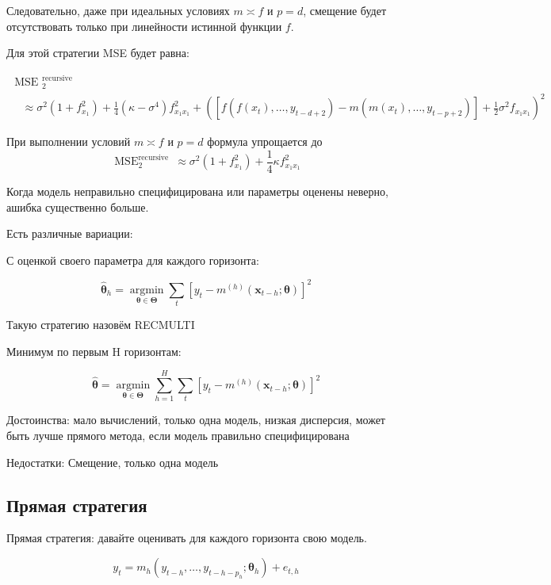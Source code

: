 \documentclass[a4paper,12pt]{article}
\begin{document}
 Следовательно, даже при идеальных условиях  $ m \asymp f $ и $ p = d $, смещение будет отсутствовать только при линейности истинной функции $ f $. 
 
 Для этой стратегии MSE будет равна:
 
\[
\begin{array}{l}{\text { MSE }_{2}^{\text {recursive }}} \\ {\quad \approx \sigma^{2}\left(1+f_{x_{1}}^{2}\right)+\frac{1}{4}\left(\kappa-\sigma^{4}\right) f_{x_{1} x_{1}}^{2}+\left(\left[f\left(f\left(x_{t}\right), \ldots, y_{t-d+2}\right)-m\left(m\left(x_{t}\right), \ldots, y_{t-p+2}\right)\right]+\frac{1}{2} \sigma^{2} f_{x_{1} x_{1}}\right)^{2}}\end{array}
\]

При выполнении условий $ m \asymp f $ и $ p = d $ формула упрощается до \[
\operatorname{MSE}_{2}^{\text {recursive }} \approx \sigma^{2}\left(1+f_{x_{1}}^{2}\right)+\frac{1}{4} \kappa f_{x_{1} x_{1}}^{2}
\]

Когда модель неправильно специфицирована или параметры оценены неверно, ашибка существенно больше. 

Есть различные вариации:

С оценкой своего параметра для каждого горизонта:

\[
\hat{\boldsymbol{\theta}}_{h}=\underset{\boldsymbol{\theta} \in \boldsymbol{\Theta}}{\operatorname{argmin}} \sum_{t}\left[y_{t}-m^{(h)}\left(\boldsymbol{x}_{t-h} ; \boldsymbol{\theta}\right)\right]^{2}
\]

Такую стратегию назовём RECMULTI

Минимум по первым H горизонтам:

\[
\hat{\boldsymbol{\theta}}=\underset{\boldsymbol{\theta} \in \boldsymbol{\Theta}}{\operatorname{argmin}} \sum_{h=1}^{H} \sum_{t}\left[y_{t}-m^{(h)}\left(\boldsymbol{x}_{t-h} ; \boldsymbol{\theta}\right)\right]^{2}
\]

Достоинства: мало вычислений, только одна модель, низкая дисперсия, может быть лучше прямого метода, если модель правильно специфицирована

Недостатки: Смещение, только одна модель
\subsection{Прямая стратегия}

Прямая стратегия: давайте оценивать для каждого горизонта свою модель.

\[ y_{t}=m_{h}\left(y_{t-h}, \ldots, y_{t-h-p_{h}} ; \boldsymbol{\theta}_{h}\right)+e_{t, h} \]
\end{document}
